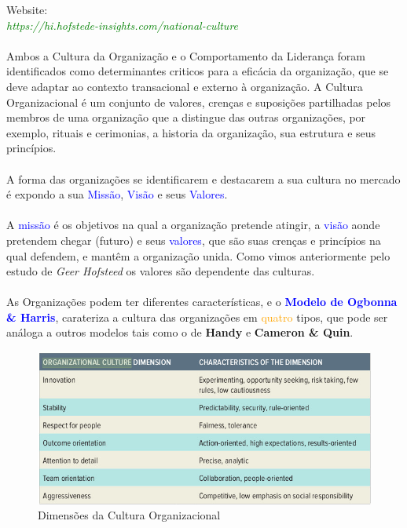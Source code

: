 Website:\\
\textit{\textcolor{green}{https://hi.hofstede-insights.com/national-culture}} \\
\\
Ambos a Cultura da Organização e o Comportamento da Liderança foram identificados como determinantes criticos para a eficácia da organização, que se deve adaptar ao contexto transacional e externo à organização. A Cultura Organizacional é um conjunto de valores, crenças e suposições partilhadas pelos membros de uma organização que a distingue das outras organizações, por exemplo, rituais e cerimonias, a historia da organização, sua estrutura e seus princípios.\cite{book_9}\\
\\
A forma das organizações se identificarem e destacarem a sua cultura no mercado é expondo a sua \textcolor{blue}{Missão}, \textcolor{blue}{Visão} e seus \textcolor{blue}{Valores}.\\
\\
A \textcolor{blue}{missão} é os objetivos na qual a organização pretende atingir, a \textcolor{blue}{visão} aonde pretendem chegar (futuro) e seus \textcolor{blue}{valores}, que são suas crenças e princípios na qual defendem, e mantêm a organização unida. Como vimos anteriormente pelo estudo de \textit{Geer Hofsteed} os valores são dependente das culturas.\\
\\
As Organizações podem ter diferentes características, e o \textcolor{blue}{\textbf{Modelo de Ogbonna \& Harris}}, carateriza a cultura das organizações em \textcolor{orange}{quatro} tipos, que pode ser análoga a outros modelos tais como o de \textbf{Handy} e \textbf{Cameron \& Quin}.\\
\begin{figure}[H]
\flushleft
\captionsetup{justification=raggedright,singlelinecheck=false}
\includegraphics[scale=0.4]{./image/OB/OC_Dimensions.jpg}
\caption{Dimensões da Cultura Organizacional \cite{book_4}}
\end{figure}\par
